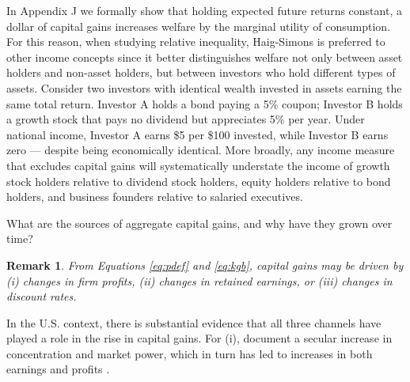\documentclass[12pt]{article}
\newtheorem{remark}{Remark}
\begin{document}
In Appendix J we formally show that holding expected future returns constant, a dollar of capital gains increases welfare by the marginal utility of consumption. For this reason, when studying relative inequality, Haig-Simons is preferred to other income concepts since it better distinguishes welfare not only between asset holders and non-asset holders, but between investors who hold different types of assets. Consider two investors with identical wealth invested in assets earning the same total return. Investor A holds a bond paying a 5\% coupon; Investor B holds a growth stock that pays no dividend but appreciates 5\% per year. Under national income, Investor A earns \$5 per \$100 invested, while Investor B earns zero — despite being economically identical. More broadly, any income measure that excludes capital gains will systematically understate the income of growth stock holders relative to dividend stock holders, equity holders relative to bond holders, and business founders relative to salaried executives.


What are the sources of aggregate capital gains, and why have they grown over time?
\begin{remark} \label{remark:hs_src} From Equations \ref{eq:pdef} and \ref{eq:kgb}, capital gains may be driven by (i) changes in firm profits, (ii) changes in retained earnings, or (iii) changes in discount rates.  \end{remark} 

\noindent In the U.S. context, there is substantial evidence that all three channels have played a role in the rise in capital gains. For (i), \citet{grullon2019us,autor2020fall} document a secular increase in concentration and market power, which in turn has led to increases in both earnings and profits \citep{barkai2020declining,eeckhout2024value}. 

\end{document}
